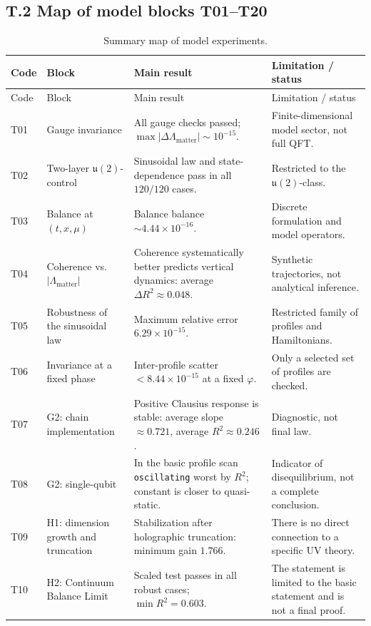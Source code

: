 \documentclass[11pt,a4paper]{article}
\theoremstyle{definition}
\theoremstyle{plain}
\theoremstyle{remark}
\begin{document}
\subsection*{T.2 Map of model blocks T01--T20}

{\small
\begin{longtable}{@{}p{1.1cm}p{3.2cm}p{5.1cm}p{3.8cm}@{}}
\caption{Summary map of model experiments.}\label{tab:appendix_t_map}\\
\toprule
Code & Block & Main result & Limitation / status \\
\midrule
\endfirsthead
\toprule
Code & Block & Main result & Limitation / status \\
\midrule
\endhead
T01 & Gauge invariance & All gauge checks passed; $\max|\Delta\Lambda_{\mathrm{matter}}|\sim10^{-15}$. & Finite-dimensional model sector, not full QFT. \\
T02 & Two-layer $\mathfrak u(2)$-control & Sinusoidal law and state-dependence pass in all $120/120$ cases. & Restricted to the $\mathfrak u(2)$-class. \\
T03 & Balance at $(t,x,\mu)$ & Balance balance $\sim4.44\times10^{-16}$. & Discrete formulation and model operators. \\
T04 & Coherence vs. $|\Lambda_{\mathrm{matter}}|$ & Coherence systematically better predicts vertical dynamics: average $\Delta R^2\approx0.048$. & Synthetic trajectories, not analytical inference. \\
T05 & Robustness of the sinusoidal law & Maximum relative error $6.29\times10^{-15}$. & Restricted family of profiles and Hamiltonians. \\
T06 & Invariance at a fixed phase & Inter-profile scatter $<8.44\times10^{-15}$ at a fixed $\varphi$. & Only a selected set of profiles are checked. \\
T07 & G2: chain implementation & Positive Clausius response is stable: average slope $\approx0.721$, average $R^2\approx0.246$. & Diagnostic, not final law. \\
T08 & G2: single-qubit & In the basic profile scan \texttt{oscillating} worst by $R^2$; constant is closer to quasi-static. & Indicator of disequilibrium, not a complete conclusion. \\
T09 & H1: dimension growth and truncation & Stabilization after holographic truncation: minimum gain $1.766$. & There is no direct connection to a specific UV theory. \\
T10 & H2: Continuum Balance Limit & Scaled test passes in all robust cases; $\min R^2=0.603$. & The statement is limited to the basic statement and is not a final proof. \\

\end{longtable}}
\end{document}

